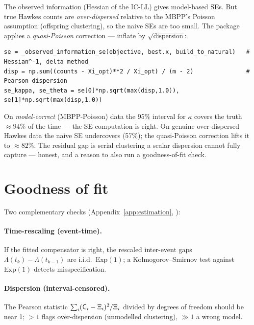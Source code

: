 The observed information (Hessian of the IC-LL) gives model-based SEs. But true
Hawkes counts are \emph{over-dispersed} relative to the MBPP's Poisson assumption
(offspring clustering), so the naive SEs are too small. The package applies a
\emph{quasi-Poisson} correction --- inflate by $\sqrt{\text{dispersion}}$:

\begin{lstlisting}[caption={Standard errors with the quasi-Poisson correction (from \code{interval\_censored.py}).}]
se = _observed_information_se(objective, best.x, build_to_natural)   # Hessian^-1, delta method
disp = np.sum((counts - Xi_opt)**2 / Xi_opt) / (m - 2)               # Pearson dispersion
se_kappa, se_theta = se[0]*np.sqrt(max(disp,1.0)), se[1]*np.sqrt(max(disp,1.0))
\end{lstlisting}

\begin{examplebox}[: coverage]
On \emph{model-correct} (MBPP-Poisson) data the 95\% interval for $\kappa$ covers
the truth $\approx94\%$ of the time --- the SE computation is right. On genuine
over-dispersed Hawkes data the naive SE undercovers (57\%); the quasi-Poisson
correction lifts it to $\approx82\%$. The residual gap is serial clustering a
scalar dispersion cannot fully capture --- honest, and a reason to also run a
goodness-of-fit check.
\end{examplebox}

\section{Goodness of fit}

Two complementary checks (Appendix~\ref{app:estimation}, ):

\paragraph{Time-rescaling (event-time).} If the fitted compensator is right, the
rescaled inter-event gaps $\Lambda(t_k)-\Lambda(t_{k-1})$ are i.i.d.\
$\mathrm{Exp}(1)$; a Kolmogorov--Smirnov test against $\mathrm{Exp}(1)$ detects
misspecification.

\paragraph{Dispersion (interval-censored).} The Pearson statistic
$\sum_i(\mathsf{C}_i-\Xi_i)^2/\Xi_i$ divided by degrees of freedom should be near 1;
$>1$ flags over-dispersion (unmodelled clustering), $\gg1$ a wrong model.

